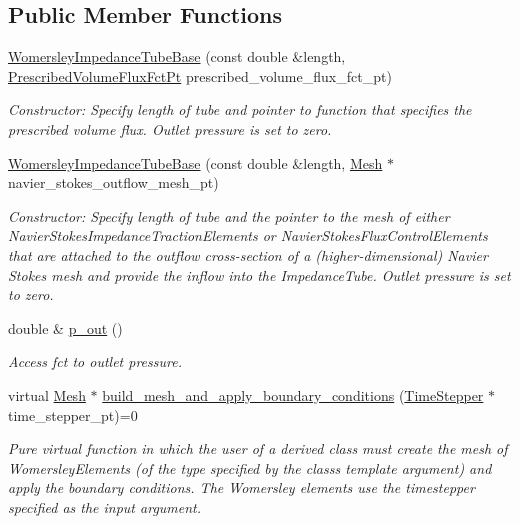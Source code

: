 \subsection*{Public Member Functions}
\begin{DoxyCompactItemize}
\item 
\hyperlink{classoomph_1_1WomersleyImpedanceTubeBase_a552fa003624cfb4e31da70f800f0669c}{Womersley\+Impedance\+Tube\+Base} (const double \&length, \hyperlink{classoomph_1_1WomersleyImpedanceTubeBase_a329107c12ef8f97c5afd4e0ae5d67b70}{Prescribed\+Volume\+Flux\+Fct\+Pt} prescribed\+\_\+volume\+\_\+flux\+\_\+fct\+\_\+pt)
\begin{DoxyCompactList}\small\item\em Constructor\+: Specify length of tube and pointer to function that specifies the prescribed volume flux. Outlet pressure is set to zero. \end{DoxyCompactList}\item 
\hyperlink{classoomph_1_1WomersleyImpedanceTubeBase_a79e8b7fb0c3edb3956aef7cf7c8bf719}{Womersley\+Impedance\+Tube\+Base} (const double \&length, \hyperlink{classoomph_1_1Mesh}{Mesh} $\ast$navier\+\_\+stokes\+\_\+outflow\+\_\+mesh\+\_\+pt)
\begin{DoxyCompactList}\small\item\em Constructor\+: Specify length of tube and the pointer to the mesh of either Navier\+Stokes\+Impedance\+Traction\+Elements or Navier\+Stokes\+Flux\+Control\+Elements that are attached to the outflow cross-\/section of a (higher-\/dimensional) Navier Stokes mesh and provide the inflow into the Impedance\+Tube. Outlet pressure is set to zero. \end{DoxyCompactList}\item 
double \& \hyperlink{classoomph_1_1WomersleyImpedanceTubeBase_abdb65e815a6b49ffb2b4ac180c968ccc}{p\+\_\+out} ()
\begin{DoxyCompactList}\small\item\em Access fct to outlet pressure. \end{DoxyCompactList}\item 
virtual \hyperlink{classoomph_1_1Mesh}{Mesh} $\ast$ \hyperlink{classoomph_1_1WomersleyImpedanceTubeBase_afbe4fd4a9e8275b010ea210a9f8b1fee}{build\+\_\+mesh\+\_\+and\+\_\+apply\+\_\+boundary\+\_\+conditions} (\hyperlink{classoomph_1_1TimeStepper}{Time\+Stepper} $\ast$time\+\_\+stepper\+\_\+pt)=0
\begin{DoxyCompactList}\small\item\em Pure virtual function in which the user of a derived class must create the mesh of Womersley\+Elements (of the type specified by the class\textquotesingle{}s template argument) and apply the boundary conditions. The Womersley elements use the timestepper specified as the input argument. \end{DoxyCompactList}\item 

\end{DoxyCompactItemize}
